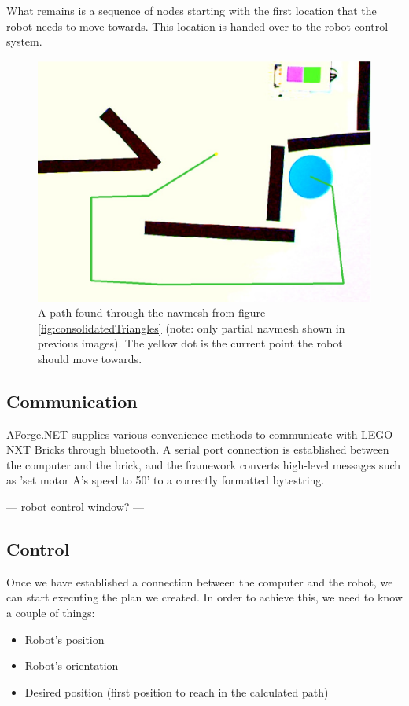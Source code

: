 \documentclass[10pt, abstracton, twocolumn]{scrartcl}
\newcommand{\fref}[1]{\hyperref[#1]{figure \vref{#1}}}
\begin{document}
What remains is a sequence of nodes starting with the first location that the robot needs to move towards. This location is handed over to the robot control system.

\begin{figure}
        \centering
        \includegraphics[width=\columnwidth]{pictures/computedPath.png}
        \caption{\small A path found through the navmesh from \fref{fig:consolidatedTriangles} (note: only partial navmesh shown in previous images). The yellow dot is the current point the robot should move towards.}
        \label{fig:computedPath}
\end{figure}

\subsection{Communication}
AForge.NET supplies various convenience methods to communicate with LEGO NXT Bricks through bluetooth. A serial port connection is established between the computer and the brick, and the framework converts high-level messages such as 'set motor A's speed to 50' to a correctly formatted bytestring.

--- robot control window? ---

\subsection{Control}
Once we have established a connection between the computer and the robot, we can start executing the plan we created. In order to achieve this, we need to know a couple of things:

\begin{itemize}
        \item Robot's position
        \item Robot's orientation
        \item Desired position (first position to reach in the calculated path)
\end{itemize}
\end{document}
